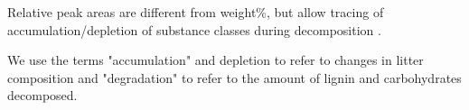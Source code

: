 \documentclass[authoryear,preprint,review,12pt]{elsarticle}
\begin{document}
                                                                                                                                                                                                                                                                                                                                                                                                                                                                                                                                                                                                                                                                                                                                                                                                                                                                                                                                                                                                                                                                                                                              Relative peak areas are different from weight\%, but allow tracing of accumulation/depletion of substance classes during decomposition \citep{Schellekens2009}.

                                                                                                                                                                                                                                                                                                                                                                                                                                                                                                                                                                                                                                                                                                                                                                                                                                                                                                                                                                                                                                                                                                                              We use the terms "accumulation" and depletion to refer to changes in litter composition and "degradation" to refer to the amount of lignin and carbohydrates decomposed.
\end{document}
